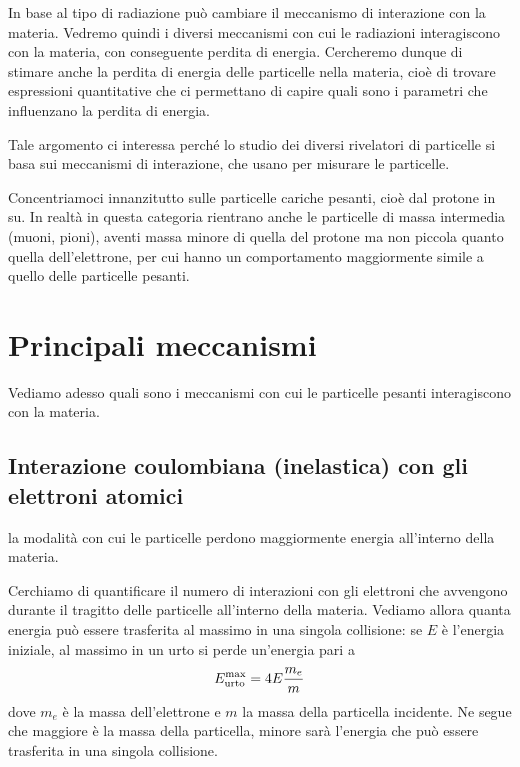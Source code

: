 In base al tipo di radiazione può cambiare il meccanismo di interazione con la materia. Vedremo quindi i diversi meccanismi con cui le radiazioni interagiscono con la materia, con conseguente perdita di energia. Cercheremo dunque di stimare anche la perdita di energia delle particelle nella materia, cioè di trovare espressioni quantitative che ci permettano di capire quali sono i parametri che influenzano la perdita di energia.

Tale argomento ci interessa perché lo studio dei diversi rivelatori di particelle si basa sui meccanismi di interazione, che usano per misurare le particelle.

Concentriamoci innanzitutto sulle particelle cariche pesanti, cioè dal protone in su. In realtà in questa categoria rientrano anche le particelle di massa intermedia (muoni, pioni), aventi massa minore di quella del protone ma non piccola quanto quella dell'elettrone, per cui hanno un comportamento maggiormente simile a quello delle particelle pesanti.

\section{Principali meccanismi}

Vediamo adesso quali sono i meccanismi con cui le particelle pesanti interagiscono con la materia.

\subsection{Interazione coulombiana (inelastica) con gli elettroni atomici}

\E la modalità con cui le particelle perdono maggiormente energia all'interno della materia.

Cerchiamo di quantificare il numero di interazioni con gli elettroni che avvengono durante il tragitto delle particelle all'interno della materia. Vediamo allora quanta energia può essere trasferita al massimo in una singola collisione: se $E$ è l'energia iniziale, al massimo in un urto si perde un'energia pari a
\begin{equation*}
    E_{\rm urto}^{\rm max}=4E\frac{m_e}{m}
\end{equation*}
dove $m_e$ è la massa dell'elettrone e $m$ la massa della particella incidente. Ne segue che maggiore è la massa della particella, minore sarà l'energia che può essere trasferita in una singola collisione.

